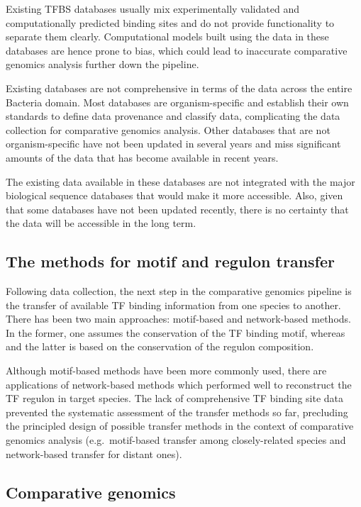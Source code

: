 Existing TFBS databases usually mix experimentally validated and
computationally predicted binding sites and do not provide functionality to
separate them clearly. Computational models built using the data in these
databases are hence prone to bias, which could lead to inaccurate comparative
genomics analysis further down the pipeline.

Existing databases are not comprehensive in terms of the data across the entire
Bacteria domain. Most databases are organism-specific and establish their own
standards to define data provenance and classify data, complicating the data
collection for comparative genomics analysis. Other databases that are not
organism-specific have not been updated in several years and miss significant
amounts of the data that has become available in recent years.

The existing data available in these databases are not integrated with the
major biological sequence databases that would make it more accessible. Also,
given that some databases have not been updated recently, there is no certainty
that the data will be accessible in the long term.

\subsection{The methods for motif and regulon transfer}
Following data collection, the next step in the comparative genomics pipeline
is the transfer of available TF binding information from one species to
another. There has been two main approaches: motif-based and network-based
methods. In the former, one assumes the conservation of the TF binding motif,
whereas and the latter is based on the conservation of the regulon composition.

Although motif-based methods have been more commonly used, there are
applications of network-based methods which performed well to reconstruct the
TF regulon in target species. The lack of comprehensive TF binding site data
prevented the systematic assessment of the transfer methods so far, precluding
the principled design of possible transfer methods in the context of
comparative genomics analysis (e.g.\ motif-based transfer among closely-related
species and network-based transfer for distant ones).


\subsection{Comparative genomics}

